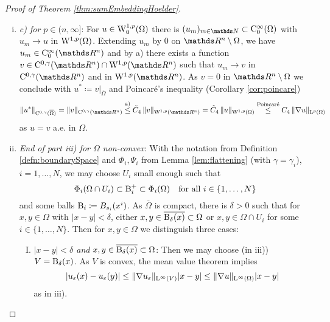 \begin{proof}[Proof of Theorem \ref{thm:sumEmbeddingHoelder}]
\begin{enumerate}[i)]
  \item \emph{c) for $p \in (n,\infty]$}:
    For $u \in \mathrm{W}_0^{1,p}(\Omega)$ there is $(u_m)_{m \in \N} \subset \CC_0^\infty(\Omega)$ with $u_m \to u$ in $\mathrm{W}^{1,p}(\Omega)$.
    Extending $u_m$ by $0$ on $\R^n \setminus \Omega$, we have $u_m \in \CC_0^\infty(\R^n)$ and by a) there exists a function $v \in \CC^{0,\gamma}(\R^n) \cap \WW^{1,p}(\R^n)$ such that $u_m \to v$ in $\CC^{0,\gamma}(\R^n)$ and in $\WW^{1,p}(\R^n)$.
    As $v = 0$ in $\R^n \setminus \Omega$ we conclude with $u^* \coloneqq v|_{\overline\Omega}$ and Poincar\'e's inequality (Corollary \ref{cor:poincare})
    $$
    \|u^*\|_{\CC^{0,\gamma}(\overline\Omega)}
    = \|v\|_{\CC^{0,\gamma}(\R^n)}
    \overset{\text{a)}}{\leq} \tilde C_4 \, \|v\|_{\WW^{1,p}(\R^n)}
    = \tilde C_4 \, \|u\|_{\WW^{1,p}(\Omega)}
    \overset{\text{Poincar\'e}}{\leq} C_4 \, \|\nabla u\|_{\Ell^p(\Omega)}
    $$
    as $u = v$ a.e. in $\Omega$.

    \item \emph{End of part iii) for $\Omega$ non-convex}:
      With the notation from Definition \ref{defn:boundarySpace} and $\Phi_i, \Psi_i$ from Lemma \ref{lem:flattening} (with $\gamma = \gamma_i$), $i = 1,\dots,N$, we may choose $U_i$ small enough such that 
      $$\Phi_i(\Omega \cap U_i) \subset \mathrm{B}_i^+ \subset \Phi_i(\Omega)\quad\text{for all } i \in \{1,\dots,N\}$$ and some balls $\mathrm{B}_i \coloneqq B_{s_i}(x^i)$.
      As $\overline\Omega$ is compact, there is $\delta > 0$ such that for $x,y \in \Omega$ with $|x - y| < \delta$, either $x,y \in \overline{\mathrm{B}_\delta(x)} \subset \Omega$ or $x, y \in \Omega \cap U_i$ for some $i \in \{1,\dots,N\}$.
      Then for $x,y \in \Omega$ we distinguish three cases:
      \begin{enumerate}[I)]
        \item \emph{$|x -y| < \delta$ and $x,y \in \overline{\mathrm{B}_\delta(x)} \subset \Omega$}:
          Then we may choose (in iii)) $V = \mathrm{B}_\delta(x)$.
          As $V$ is convex, the mean value theorem implies 
          $$
          |u_\varepsilon(x) - u_\varepsilon(y)| 
          \leq \| \nabla u_\varepsilon\|_{\mathrm{L}^\infty(V)} |x - y|
          \leq \| \nabla u\|_{\mathrm{L}^\infty(\Omega)} |x - y|
          $$
          as in iii).


\end{enumerate}
\end{enumerate}
\end{proof}
